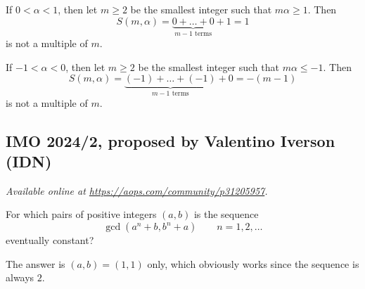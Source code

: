 \documentclass[11pt]{scrartcl}
\begin{document}
\begin{itemize}
  \ii If $0 < \alpha < 1$,
  then let $m \ge 2$ be the smallest integer such that $m \alpha \ge 1$.
  Then
  \[ S(m, \alpha) = \underbrace{0 + \dots + 0}_{m-1\text{ terms}} + 1 = 1 \]
  is not a multiple of $m$.

  \ii If $-1 < \alpha < 0$,
  then let $m \ge 2$ be the smallest integer such that $m \alpha \le -1$.
  Then
  \[ S(m, \alpha) = \underbrace{(-1) + \dots + (-1)}_{m-1\text{ terms}} + 0 = -(m-1) \]
  is not a multiple of $m$.
\end{itemize}
\pagebreak

\subsection{IMO 2024/2, proposed by Valentino Iverson (IDN)}
\textsl{Available online at \url{https://aops.com/community/p31205957}.}
\begin{mdframed}[style=mdpurplebox,frametitle={Problem statement}]
For which pairs of positive integers $(a,b)$ is the sequence
\[ \gcd(a^n+b, b^n+a) \qquad n = 1, 2, \dotsc \]
eventually constant?
\end{mdframed}
The answer is $(a,b)=(1,1)$ only, which obviously works since the sequence is always $2$.
\end{document}

